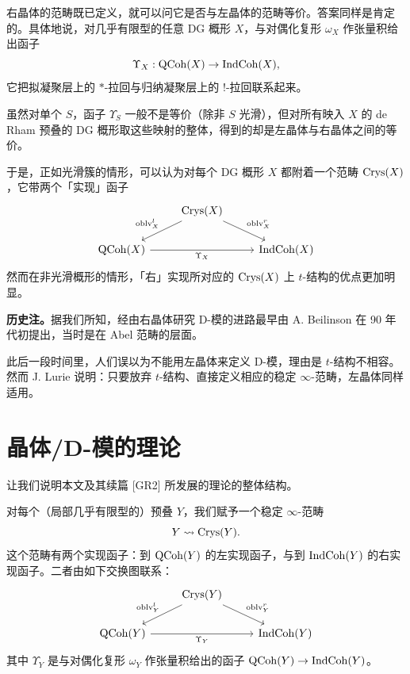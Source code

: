 右晶体的范畴既已定义，就可以问它是否与左晶体的范畴等价。答案同样是肯定的。具体地说，对几乎有限型的任意 DG 概形 $X$，与对偶化复形 $\omega_X$ 作张量积给出函子
\[
\Upsilon_X:\mathrm{QCoh}(X)\to\mathrm{IndCoh}(X),
\]
它把拟凝聚层上的 $*$-拉回与归纳凝聚层上的 $!$-拉回联系起来。

虽然对单个 $S$，函子 $\Upsilon_S$ 一般不是等价（除非 $S$ 光滑），但对所有映入 $X$ 的 de Rham 预叠的 DG 概形取这些映射的整体，得到的却是左晶体与右晶体之间的等价。

于是，正如光滑簇的情形，可以认为对每个 DG 概形 $X$ 都附着一个范畴 $\mathrm{Crys}(X)$，它带两个「实现」函子
\[
\begin{tikzcd}
 & \Crys(X) \arrow[dl, "\oblv^l_X"'] \arrow[dr, "\oblv^r_X"] & \\
 \QCoh(X) \arrow[rr, "\Upsilon_X"'] & & \IndCoh(X)
\end{tikzcd}
\]
然而在非光滑概形的情形，「右」实现所对应的 $\mathrm{Crys}(X)$ 上 $t$-结构的优点更加明显。

\textbf{历史注。}据我们所知，经由右晶体研究 D-模的进路最早由 A. Beilinson 在 90 年代初提出，当时是在 Abel 范畴的层面。

此后一段时间里，人们误以为不能用左晶体来定义 D-模，理由是 $t$-结构不相容。然而 J. Lurie 说明：只要放弃 $t$-结构、直接定义相应的稳定 $\infty$-范畴，左晶体同样适用。

\section{晶体/D-模的理论}

让我们说明本文及其续篇 [GR2] 所发展的理论的整体结构。

对每个（局部几乎有限型的）预叠 $Y$，我们赋予一个稳定 $\infty$-范畴
\[
Y\rightsquigarrow\mathrm{Crys}(Y).
\]
这个范畴有两个实现函子：到 $\mathrm{QCoh}(Y)$ 的左实现函子，与到 $\mathrm{IndCoh}(Y)$ 的右实现函子。二者由如下交换图联系：
\[
\begin{tikzcd}
 & \Crys(Y) \arrow[dl, "\oblv^l_Y"'] \arrow[dr, "\oblv^r_Y"] & \\
 \QCoh(Y) \arrow[rr, "\Upsilon_Y"'] & & \IndCoh(Y)
\end{tikzcd}
\]
其中 $\Upsilon_Y$ 是与对偶化复形 $\omega_Y$ 作张量积给出的函子 $\mathrm{QCoh}(Y)\to\mathrm{IndCoh}(Y)$。

